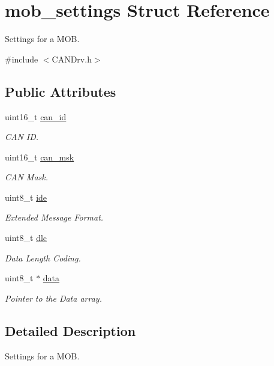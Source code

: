 \hypertarget{structmob__settings}{}\section{mob\+\_\+settings Struct Reference}
\label{structmob__settings}


Settings for a M\+OB.  




{\ttfamily \#include $<$C\+A\+N\+Drv.\+h$>$}

\subsection*{Public Attributes}
\begin{DoxyCompactItemize}
\item 
uint16\+\_\+t \hyperlink{structmob__settings_a45cb3ff981e8309e106c70339f15df52}{can\+\_\+id}
\begin{DoxyCompactList}\small\item\em C\+AN ID. \end{DoxyCompactList}\item 
uint16\+\_\+t \hyperlink{structmob__settings_a87ca4f26ce4d508ad0813ed4176bb091}{can\+\_\+msk}
\begin{DoxyCompactList}\small\item\em C\+AN Mask. \end{DoxyCompactList}\item 
uint8\+\_\+t \hyperlink{structmob__settings_af49f35b823927e40978d94b1f7d42a29}{ide}
\begin{DoxyCompactList}\small\item\em Extended Message Format. \end{DoxyCompactList}\item 
uint8\+\_\+t \hyperlink{structmob__settings_a8e7f699a671f43bee5abe7f686961b29}{dlc}
\begin{DoxyCompactList}\small\item\em Data Length Coding. \end{DoxyCompactList}\item 
uint8\+\_\+t $\ast$ \hyperlink{structmob__settings_abafdc0b4f1267289be2160c8b5ed6b34}{data}
\begin{DoxyCompactList}\small\item\em Pointer to the Data array. \end{DoxyCompactList}\end{DoxyCompactItemize}


\subsection{Detailed Description}
Settings for a M\+OB. 

